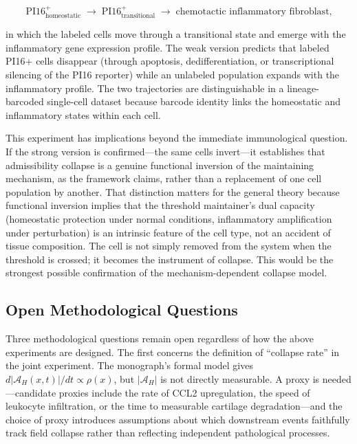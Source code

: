 \documentclass[12pt, a4paper]{article}
\theoremstyle{definition}
\begin{document}
\begin{equation}
\text{PI16}^{+}_{\text{homeostatic}} \;\longrightarrow\; \text{PI16}^{+}_{\text{transitional}} \;\longrightarrow\; \text{chemotactic inflammatory fibroblast,}
\end{equation}

in which the labeled cells move through a transitional state and emerge with the inflammatory gene expression profile. The weak version predicts that labeled PI16+ cells disappear (through apoptosis, dedifferentiation, or transcriptional silencing of the PI16 reporter) while an unlabeled population expands with the inflammatory profile. The two trajectories are distinguishable in a lineage-barcoded single-cell dataset because barcode identity links the homeostatic and inflammatory states within each cell.

This experiment has implications beyond the immediate immunological question. If the strong version is confirmed---the same cells invert---it establishes that admissibility collapse is a genuine functional inversion of the maintaining mechanism, as the framework claims, rather than a replacement of one cell population by another. That distinction matters for the general theory because functional inversion implies that the threshold maintainer's dual capacity (homeostatic protection under normal conditions, inflammatory amplification under perturbation) is an intrinsic feature of the cell type, not an accident of tissue composition. The cell is not simply removed from the system when the threshold is crossed; it becomes the instrument of collapse. This would be the strongest possible confirmation of the mechanism-dependent collapse model.

\subsection{Open Methodological Questions}

Three methodological questions remain open regardless of how the above experiments are designed. The first concerns the definition of ``collapse rate'' in the joint experiment. The monograph's formal model gives $d|\mathcal{A}_H(x,t)|/dt \propto \rho(x)$, but $|\mathcal{A}_H|$ is not directly measurable. A proxy is needed---candidate proxies include the rate of CCL2 upregulation, the speed of leukocyte infiltration, or the time to measurable cartilage degradation---and the choice of proxy introduces assumptions about which downstream events faithfully track field collapse rather than reflecting independent pathological processes.
\end{document}
